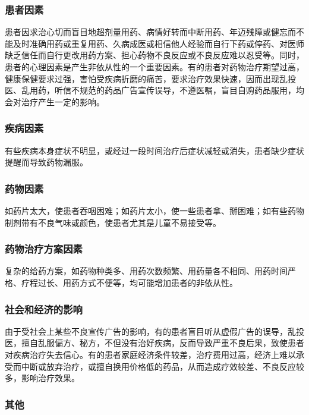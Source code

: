 \subsubsection{患者因素}

患者因求治心切而盲目地超剂量用药、病情好转而中断用药、年迈残障或健忘而不能及时准确用药或重复用药、久病成医或相信他人经验而自行下药或停药、对医师缺乏信任而自行更改用药方案、担心药物不良反应或不良反应难以忍受等。同时，患者的心理因素是产生非依从性的一个重要因素。有的患者对药物治疗期望过高，健康保健要求过强，害怕受疾病折磨的痛苦，要求治疗效果快速，因而出现乱投医、乱用药，听信不规范的药品广告宣传误导，不遵医嘱，盲目自购药品服用，均会对治疗产生一定的影响。

\subsubsection{疾病因素}

有些疾病本身症状不明显，或经过一段时间治疗后症状减轻或消失，患者缺少症状提醒而导致药物漏服。

\subsubsection{药物因素}

如药片太大，使患者吞咽困难；如药片太小，使一些患者拿、掰困难；如有些药物制剂带有不良气味或颜色，使患者尤其是儿童不易接受等。

\subsubsection{药物治疗方案因素}

复杂的给药方案，如药物种类多、用药次数频繁、用药量各不相同、用药时间严格、疗程过长、用药方式不便等，均可能增加患者的非依从性。

\subsubsection{社会和经济的影响}

由于受社会上某些不良宣传广告的影响，有的患者盲目听从虚假广告的误导，乱投医，擅自乱服偏方、秘方，不但没有治好疾病，反而导致严重不良后果，致使患者对疾病治疗失去信心。有的患者家庭经济条件较差，治疗费用过高，经济上难以承受而中断或放弃治疗，或擅自换用价格低的药品，从而造成疗效较差、不良反应较多，影响治疗效果。

\subsubsection{其他}

